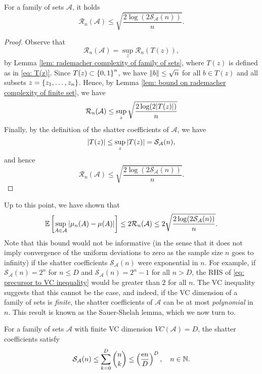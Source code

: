 \begin{proposition}
\label{prop: bound on rademacher complexity of family of sets}
For a family of sets $\mathcal{A}$, it holds
\[
    \mathcal{R}_n(\mathcal{A}) \leq \sqrt{ \frac{2 \log(2 \mathcal{S}_{\mathcal{A}}(n)) }{n} }.
\]
\end{proposition}

\begin{proof}
Observe that
\[
    \mathcal{R}_n(\mathcal{A}) = \sup_z \mathcal{R}_n(T(z)),
\]
by Lemma \ref{lem: rademacher complexity of family of sets}, where $T(z)$ is defined as in \eqref{eq: T(z)}. Since $T(z) \subset \left\{0, 1\right\}^n$, we have $\norm{b} \leq \sqrt{n}$ for all $b \in T(z)$ and all subsets $z = \left\{z_1, \dots, z_n\right\}$. Hence, by Lemma \ref{lem: bound on rademacher complexity of finite set}, we have
\[
    \mathcal{R}_n(\mathcal{A}) \leq \sup_z \sqrt{\frac{2 \log(2 \abs{T(z)})}{n}}
\]
Finally, by the definition of the shatter coefficients of $\mathcal{A}$, we have
\[
    \abs{T(z)} \leq \sup_z \abs{T(z)} = \mathcal{S}_{\mathcal{A}}(n),
\]
and hence
\[
    \mathcal{R}_n(\mathcal{A}) \leq \sqrt{ \frac{2 \log(2 \mathcal{S}_{\mathcal{A}}(n)) }{n} }.
\]
\end{proof}

Up to this point, we have shown that
\begin{equation}
\label{eq: precursor to VC inequality}
    \mathbb{E}\left[ \sup_{A \in \mathcal{A}} \abs{\mu_n(A) - \mu(A)} \right] \leq 2 \mathcal{R}_n(\mathcal{A}) \leq 2 \sqrt{ \frac{2 \log(2 \mathcal{S}_{\mathcal{A}}(n)) }{n} }.
\end{equation}
Note that this bound would not be informative (in the sense that it does not imply convergence of the uniform deviations to zero as the sample size $n$ goes to infinity) if the shatter coefficients $\mathcal{S}_{\mathcal{A}}(n)$ were exponential in $n$. For example, if $\mathcal{S}_{\mathcal{A}}(n) = 2^n$ for $n \leq D$ and $\mathcal{S}_{\mathcal{A}}(n) = 2^n - 1$ for all $n > D$, the RHS of \eqref{eq: precursor to VC inequality} would be greater than $2$ for all $n$. The VC inequality suggests that this cannot be the case, and indeed, if the VC dimension of a family of sets is \emph{finite}, the shatter coefficients of $\mathcal{A}$ can be at most \emph{polynomial} in $n$. This result is known as the Sauer-Shelah lemma, which we now turn to.

\begin{lemma}
For a family of sets $\mathcal{A}$ with finite VC dimension $VC(\mathcal{A}) = D$, the shatter coefficients satisfy
\[
    \mathcal{S}_{\mathcal{A}}(n) \leq \sum_{k=0}^D \binom{n}{k} \leq \left( \frac{\mathrm{e} n}{D} \right)^D, \quad n \in \mathbb{N}.
\]
\end{lemma}

